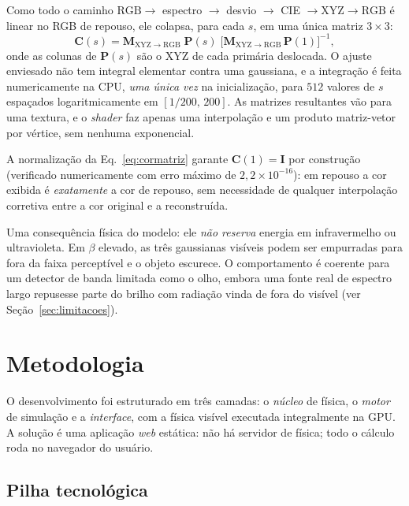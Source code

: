 \documentclass[10pt,a4paper,twocolumn]{article}
\begin{document}
Como todo o caminho $\mathrm{RGB} \to$ espectro $\to$ desvio $\to$ CIE $\to
\mathrm{XYZ} \to \mathrm{RGB}$ é linear no RGB de repouso, ele colapsa, para cada $s$, em
uma única matriz $3\times3$:
\begin{equation}
  \mathbf{C}(s) = \mathbf{M}_{\mathrm{XYZ}\to\mathrm{RGB}}\;\mathbf{P}(s)\;
                  \bigl[\mathbf{M}_{\mathrm{XYZ}\to\mathrm{RGB}}\,\mathbf{P}(1)\bigr]^{-1},
  \label{eq:cormatriz}
\end{equation}
onde as colunas de $\mathbf{P}(s)$ são o XYZ de cada primária deslocada. O ajuste
enviesado não tem integral elementar contra uma gaussiana, e a integração é feita
numericamente na CPU, \emph{uma única vez} na inicialização, para $512$ valores de $s$
espaçados logaritmicamente em $[1/200,\,200]$. As matrizes resultantes vão para uma
textura, e o \emph{shader} faz apenas uma interpolação e um produto matriz-vetor por
vértice, sem nenhuma exponencial.

A normalização da Eq.~\eqref{eq:cormatriz} garante $\mathbf{C}(1) = \mathbf{I}$ por
construção (verificado numericamente com erro máximo de $2{,}2\times10^{-16}$): em repouso
a cor exibida é \emph{exatamente} a cor de repouso, sem necessidade de qualquer
interpolação corretiva entre a cor original e a reconstruída.

Uma consequência física do modelo: ele \emph{não reserva} energia em infravermelho ou
ultravioleta. Em $\beta$ elevado, as três gaussianas visíveis podem ser empurradas para
fora da faixa perceptível e o objeto escurece. O comportamento é coerente para um detector
de banda limitada como o olho, embora uma fonte real de espectro largo repusesse parte do
brilho com radiação vinda de fora do visível (ver Seção~\ref{sec:limitacoes}).

\section{Metodologia}

O desenvolvimento foi estruturado em três camadas: o \emph{núcleo} de física, o
\emph{motor} de simulação e a \emph{interface}, com a física visível executada
integralmente na GPU. A solução é uma aplicação \emph{web} estática: não há servidor de
física; todo o cálculo roda no navegador do usuário.

\subsection{Pilha tecnológica}
\end{document}
